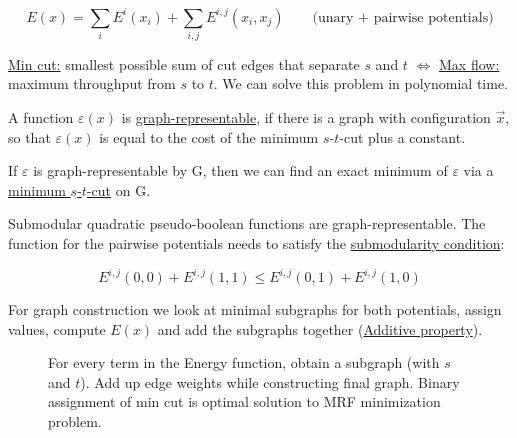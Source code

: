 \[E(x) = \sum_i E^i(x_i) + \sum_{i,j} E^{i,j} (x_i, x_j) \qquad \text{(unary + pairwise potentials)}\]

\underline{Min cut:} smallest possible sum of cut edges that separate $s$ and $t$ $\Leftrightarrow$ \underline{Max flow:} maximum throughput from $s$ to $t$. We can solve this problem in polynomial time.

A function $\varepsilon(x)$ is \underline{graph-representable}, if there is a graph with configuration $\vec{x}$, so that $\varepsilon(x)$ is equal to the cost of the minimum $s$-$t$-cut plus a constant.

If $\varepsilon$ is graph-representable by G, then we can find an exact minimum of $\varepsilon$ via a \underline{minimum $s$-$t$-cut} on G.

Submodular quadratic pseudo-boolean functions are graph-representable. The function for the pairwise potentials needs to satisfy the \underline{submodularity condition}:

\[E^{i,j}(0,0) + E^{i,j}(1,1) \leq E^{i,j}(0,1) + E^{i,j}(1,0)\]

For graph construction we look at minimal subgraphs for both potentials, assign values, compute $E(x)$ and add the subgraphs together (\underline{Additive property}).

\begin{figure}[H]
	\centering
  
  \caption[Min cut]{For every term in the Energy function, obtain a subgraph (with $s$ and $t$). Add up edge weights while constructing final graph. Binary assignment of min cut is optimal solution to MRF minimization problem.}
\end{figure}